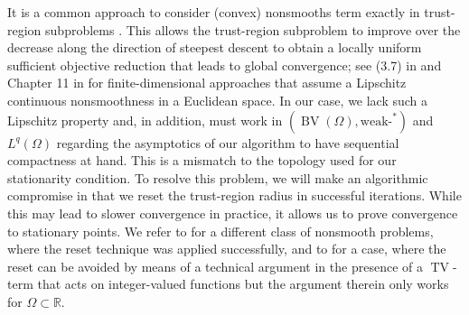 \documentclass[11pt]{article}
\newcommand{\R}{\mathbb{R}}
\DeclareMathOperator*{\BV}{BV}
\DeclareMathOperator*{\TV}{TV}
\theoremstyle{definition}
\theoremstyle{remark}
\begin{document}
It is a common approach to consider (convex) nonsmooths term exactly in trust-region subproblems
\cite{fletcher1982model,yuan1985conditions,hansknecht2024convergence,leyffer2022sequential,manns2023integer}.
This allows the trust-region subproblem to improve over the decrease along the direction of steepest descent to
obtain a locally uniform sufficient objective reduction that leads to global convergence; see (3.7)
in \cite{fletcher1982model} and Chapter 11 in \cite{conn2000trust} for finite-dimensional approaches that
assume a Lipschitz continuous nonsmoothness in a Euclidean space. In our case, we lack such a Lipschitz
property and, in addition, must work in $(\BV(\Omega), \text{weak-}^*)$ and $L^q(\Omega)$ regarding
the asymptotics of our algorithm to have sequential compactness at hand. This is a mismatch
to the topology used for our stationarity condition. To resolve this problem, we will make an algorithmic
compromise in that we reset the trust-region radius in successful iterations. While this may lead to slower
convergence in practice, it allows us to prove convergence to stationary points. We refer to 
\cite{manns2023integer,manns2025homotopy} for a different class of nonsmooth problems,
where the reset technique was applied successfully, and to \cite{manns2026convergence} for a case,
where the reset can be avoided by means of a technical argument in the presence of a $\TV$-term
that acts on integer-valued functions but the argument therein only works for $\Omega \subset \R$.
\end{document}
